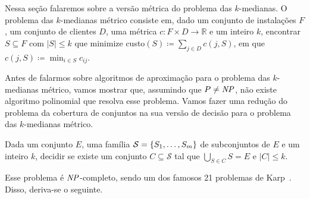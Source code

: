 Nessa seção falaremos sobre a versão métrica do problema das $k$-medianas. 
O problema das $k$-medianas métrico consiste em, dado um conjunto de instalações $F$, um conjunto de clientes $D$, uma métrica $c : F \times D \rightarrow \mathbb{R}$ e um inteiro $k$, encontrar $S \subseteq F$ com $|S| \leq k$ que minimize custo$(S) \coloneqq \sum_{j \in D} c(j,S)$, em que $c(j,S) \coloneqq \min_{i \in S} c_{ij}$.

Antes de falarmos sobre algoritmos de aproximação para o problema das $k$-medianas métrico, vamos mostrar que, assumindo que $P \neq \mathit{NP}$, não existe algoritmo polinomial que resolva esse problema. Vamos fazer uma redução do problema da cobertura de conjuntos na sua versão de decisão para o problema das $k$-medianas métrico.

\begin{problem}
    Dada um conjunto $E$, uma família ${\mathcal{S} = \{S_1,\ldots,S_m\}}$ de subconjuntos de $E$ e um inteiro $k$, decidir se existe um conjunto $C \subseteq \mathcal{S}$ tal que $\bigcup_{S \in C} S = E$ e $|C| \leq k$.
\end{problem}

Esse problema é $\mathit{NP}$-completo, sendo um dos famosos 21 problemas de Karp~\cite{Karp1972}. Disso, deriva-se o seguinte.

